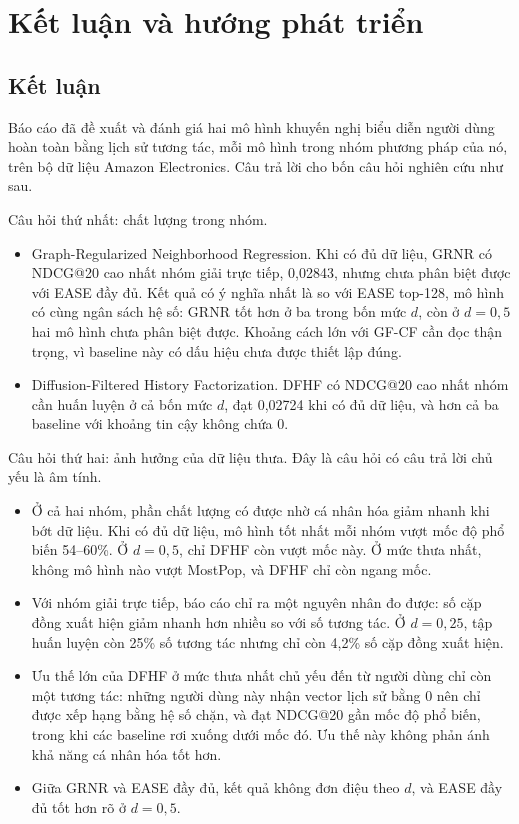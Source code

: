 \section{Kết luận và hướng phát triển}
\label{sec:conclusion}

\subsection{Kết luận}

Báo cáo đã đề xuất và đánh giá hai mô hình khuyến nghị biểu diễn người dùng hoàn toàn bằng lịch sử tương tác, mỗi mô hình trong nhóm phương pháp của nó, trên bộ dữ liệu Amazon Electronics. Câu trả lời cho bốn câu hỏi nghiên cứu như sau.

Câu hỏi thứ nhất: chất lượng trong nhóm.
\begin{itemize}
\item Graph-Regularized Neighborhood Regression. Khi có đủ dữ liệu, GRNR có NDCG@20 cao nhất nhóm giải trực tiếp, 0,02843, nhưng chưa phân biệt được với EASE đầy đủ. Kết quả có ý nghĩa nhất là so với EASE top-128, mô hình có cùng ngân sách hệ số: GRNR tốt hơn ở ba trong bốn mức $d$, còn ở $d=0{,}5$ hai mô hình chưa phân biệt được. Khoảng cách lớn với GF-CF cần đọc thận trọng, vì baseline này có dấu hiệu chưa được thiết lập đúng.
\item Diffusion-Filtered History Factorization. DFHF có NDCG@20 cao nhất nhóm cần huấn luyện ở cả bốn mức $d$, đạt 0,02724 khi có đủ dữ liệu, và hơn cả ba baseline với khoảng tin cậy không chứa 0.
\end{itemize}

Câu hỏi thứ hai: ảnh hưởng của dữ liệu thưa. Đây là câu hỏi có câu trả lời chủ yếu là âm tính.
\begin{itemize}
\item Ở cả hai nhóm, phần chất lượng có được nhờ cá nhân hóa giảm nhanh khi bớt dữ liệu. Khi có đủ dữ liệu, mô hình tốt nhất mỗi nhóm vượt mốc độ phổ biến 54--60\%. Ở $d=0{,}5$, chỉ DFHF còn vượt mốc này. Ở mức thưa nhất, không mô hình nào vượt MostPop, và DFHF chỉ còn ngang mốc.
\item Với nhóm giải trực tiếp, báo cáo chỉ ra một nguyên nhân đo được: số cặp đồng xuất hiện giảm nhanh hơn nhiều so với số tương tác. Ở $d=0{,}25$, tập huấn luyện còn 25\% số tương tác nhưng chỉ còn 4,2\% số cặp đồng xuất hiện.
\item Ưu thế lớn của DFHF ở mức thưa nhất chủ yếu đến từ người dùng chỉ còn một tương tác: những người dùng này nhận vector lịch sử bằng 0 nên chỉ được xếp hạng bằng hệ số chặn, và đạt NDCG@20 gần mốc độ phổ biến, trong khi các baseline rơi xuống dưới mốc đó. Ưu thế này không phản ánh khả năng cá nhân hóa tốt hơn.
\item Giữa GRNR và EASE đầy đủ, kết quả không đơn điệu theo $d$, và EASE đầy đủ tốt hơn rõ ở $d=0{,}5$.
\end{itemize}


